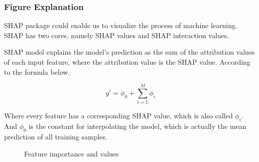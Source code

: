 \documentclass[
  journal=medium,
  manuscript=Report,
  year=2023,
  volume=37,
]{cup-journal}
\begin{document}
\subsubsection{Figure Explanation}

SHAP package could enable us to visualize the process of machine learning. SHAP has two cores, namely SHAP values and SHAP interaction values.

SHAP model explains the model's prediction as the sum of the attribution values of each input feature, where the attribution value is the SHAP value. According to the formula below.

$$y' = \phi_0 + \sum_{i=1}^{M}\phi_i$$

Where every feature has a corresponding SHAP value, which is also called $\phi_i$. And $\phi_0$ is the constant for interpolating the model, which is actually the mean prediction of all training samples.

\begin{figure}[!htbp]
    \centering
    \hfill
    \caption{Feature importance and values}
    \label{combine3}
\end{figure}
\end{document}
